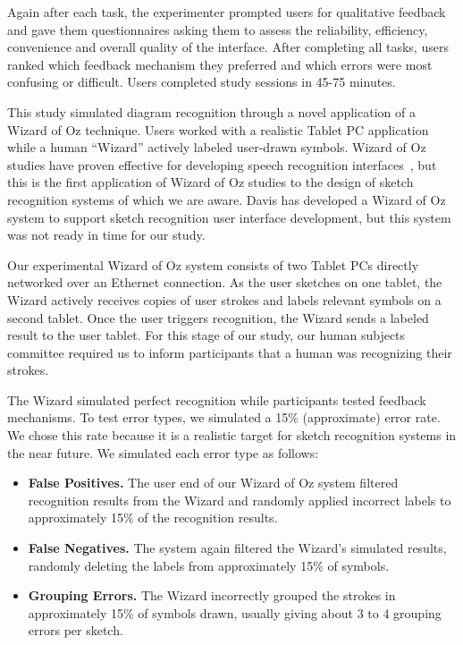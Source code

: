\documentclass{elsart}
\begin{document}
Again after each task, the experimenter prompted users for qualitative
feedback and gave them questionnaires asking them to assess the
reliability, efficiency, convenience and overall quality of the
interface.  After completing all tasks, users ranked which feedback
mechanism they preferred and which errors were most confusing or
difficult.  Users completed study sessions in 45-75 minutes.

This study simulated diagram recognition through a novel application
of a Wizard of Oz technique.  Users worked with a realistic Tablet PC
application while a human ``Wizard'' actively labeled user-drawn
symbols.  Wizard of Oz studies have proven
effective for developing speech recognition
interfaces~\cite{Dahlback1993Wizard,Klemmer2000Suede}, but this is the
first application of Wizard of Oz studies to the design of sketch
recognition systems of which we are aware.  Davis has developed a
Wizard of Oz system to support sketch recognition user interface
development\cite{Davis2007SketchWizard}, but this system was not ready
in time for our study.

Our experimental Wizard of Oz system consists of two Tablet PCs directly 
networked over an Ethernet connection.  As the user sketches on one tablet, the
Wizard actively receives copies of user strokes and labels relevant
symbols on a second tablet.  Once the user triggers recognition, the
Wizard sends a labeled result to the user tablet.  For this stage of
our study, our human subjects committee required us to inform
participants that a human was recognizing their strokes.


The Wizard simulated perfect recognition while participants tested
feedback mechanisms.  To test error types, we simulated a 15\%
(approximate) error rate.  We chose this rate because it is a
realistic target for sketch recognition systems in the near future.  We
simulated each error type as follows:
\begin{itemize}
\item \textbf{False Positives.} The user end of our Wizard
of Oz system filtered recognition results from the Wizard and randomly
applied incorrect labels to approximately 15\% of the
recognition results.
\item \textbf{False Negatives.} The system again filtered the Wizard's simulated results,
randomly deleting the labels from approximately 15\% of symbols.
\item \textbf{Grouping Errors.}  The
Wizard incorrectly grouped the strokes in
approximately 15\% of symbols drawn, usually giving about 3 to 4
grouping errors per sketch.  
\end{itemize}
\end{document}
